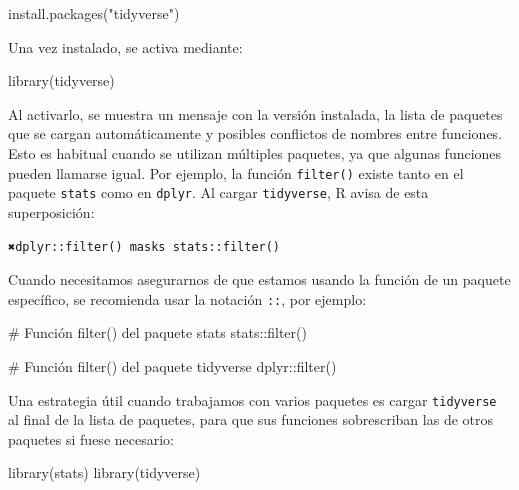 \documentclass[
  spanish,
  a4paper,
]{scrbook}
\newenvironment{Shaded}{\begin{snugshade}}{\end{snugshade}}
\newcommand{\CommentTok}[1]{\textcolor[rgb]{0.37,0.37,0.37}{#1}}
\newcommand{\FunctionTok}[1]{\textcolor[rgb]{0.28,0.35,0.67}{#1}}
\newcommand{\NormalTok}[1]{\textcolor[rgb]{0.00,0.23,0.31}{#1}}
\newcommand{\SpecialCharTok}[1]{\textcolor[rgb]{0.37,0.37,0.37}{#1}}
\newcommand{\StringTok}[1]{\textcolor[rgb]{0.13,0.47,0.30}{#1}}
\begin{document}
\begin{Shaded}
\begin{Highlighting}[]
\FunctionTok{install.packages}\NormalTok{(}\StringTok{"tidyverse"}\NormalTok{)}
\end{Highlighting}
\end{Shaded}

Una vez instalado, se activa mediante:

\begin{Shaded}
\begin{Highlighting}[]
\FunctionTok{library}\NormalTok{(tidyverse)}
\end{Highlighting}
\end{Shaded}

Al activarlo, se muestra un mensaje con la versión instalada, la lista
de paquetes que se cargan automáticamente y posibles conflictos de
nombres entre funciones. Esto es habitual cuando se utilizan múltiples
paquetes, ya que algunas funciones pueden llamarse igual. Por ejemplo,
la función \texttt{filter()} existe tanto en el paquete \texttt{stats}
como en \texttt{dplyr}. Al cargar \texttt{tidyverse}, R avisa de esta
superposición:

\texttt{✖️dplyr::filter()\ masks\ stats::filter()}

Cuando necesitamos asegurarnos de que estamos usando la función de un
paquete específico, se recomienda usar la notación \texttt{::}, por
ejemplo:

\begin{Shaded}
\begin{Highlighting}[]
\CommentTok{\# Función filter() del paquete stats}
\NormalTok{stats}\SpecialCharTok{::}\FunctionTok{filter}\NormalTok{()}

\CommentTok{\# Función filter() del paquete tidyverse}
\NormalTok{dplyr}\SpecialCharTok{::}\FunctionTok{filter}\NormalTok{()}
\end{Highlighting}
\end{Shaded}

Una estrategia útil cuando trabajamos con varios paquetes es cargar
\texttt{tidyverse} al final de la lista de paquetes, para que sus
funciones sobrescriban las de otros paquetes si fuese necesario:

\begin{Shaded}
\begin{Highlighting}[]
\FunctionTok{library}\NormalTok{(stats)}
\FunctionTok{library}\NormalTok{(tidyverse)}
\end{Highlighting}
\end{Shaded}
\end{document}
